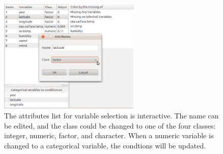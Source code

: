 \documentclass[english]{article}
\begin{document}
\begin{center}
%
\begin{figure}[h]
\begin{centering}
\includegraphics[width=0.6\textwidth]{Miss_fig8}
\par\end{centering}

\caption{The attributes list for variable selection is interactive. The name can be edited, and the class could be changed to one of the four classes: integer, numeric, factor, and character. When a numeric variable is changed to a categorical variable, the condtions will be updated.}
\label{fig: attributes}
\end{figure}

\par\end{center}
\end{document}
